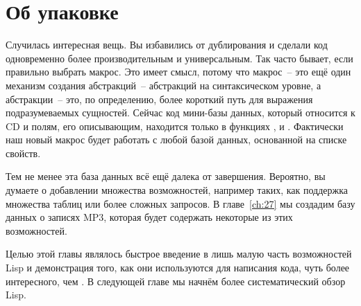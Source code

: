 \section{Об упаковке}

Случилась интересная вещь. Вы избавились от дублирования и сделали код одновременно более
производительным и универсальным. Так часто бывает, если правильно выбрать макрос. Это
имеет смысл, потому что макрос~-- это ещё один механизм создания абстракций~--
абстракций на синтаксическом уровне, а абстракции~-- это, по определению, более короткий
путь для выражения подразумеваемых сущностей. Сейчас код мини-базы данных, который
относится к CD и полям, его описывающим, находится только в функциях ,
 и . Фактически наш новый макрос будет работать с любой
базой данных, основанной на списке свойств.

Тем не менее эта база данных всё ещё далека от завершения. Вероятно, вы думаете о
добавлении множества возможностей, например таких, как поддержка множества таблиц или
более сложных запросов. В главе~\ref{ch:27} мы создадим базу данных о записях MP3, которая будет
содержать некоторые из этих возможностей.

Целью этой главы являлось быстрое введение в лишь малую часть возможностей Lisp и
демонстрация того, как они используются для написания кода, чуть более интересного, чем
. В следующей главе мы начнём более систематический обзор Lisp.

